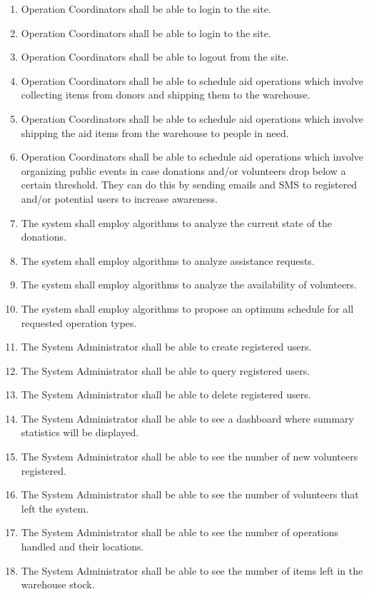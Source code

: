 \documentclass[a4paper,12pt]{report}
\begin{document}
\begin{enumerate}
		\item Operation Coordinators shall be able to login to the site.
		\item Operation Coordinators shall be able to login to the site.
		\item Operation Coordinators shall be able to logout from the site.
		
		
		\item Operation Coordinators shall be able to schedule aid operations which involve collecting items from donors and shipping them to the warehouse.
		
		\item Operation Coordinators shall be able to schedule aid operations which involve shipping the aid items from the warehouse to people in need.
		
		\item  Operation Coordinators shall be able to schedule aid operations which involve organizing public events in case donations and/or volunteers drop below a certain threshold. They can do this by sending emails and SMS to registered and/or potential users to increase awareness.
		
		\item The system shall employ algorithms to analyze the current state of the donations.
		
		\item The system shall employ algorithms to analyze assistance requests.
		
		\item The system shall employ algorithms to analyze the availability of volunteers.
		
		\item The system shall employ algorithms to propose an optimum schedule for all requested operation types.
		
		\item The System Administrator shall be able to create registered users.
		
		\item The System Administrator shall be able to query registered users.
		
		\item The System Administrator shall be able to delete registered users.
		
		\item The System Administrator shall be able to see a dashboard where summary statistics will be displayed. 
		
		\item The System Administrator shall be able to see the number of new volunteers registered.
		
		\item The System Administrator shall be able to see the number of volunteers that left the system.
		\item The System Administrator shall be able to see the number of operations handled and their locations.
		
		\item The System Administrator shall be able to see the number of items left in the warehouse stock.
		
		
		
	\end{enumerate}
\end{document}
